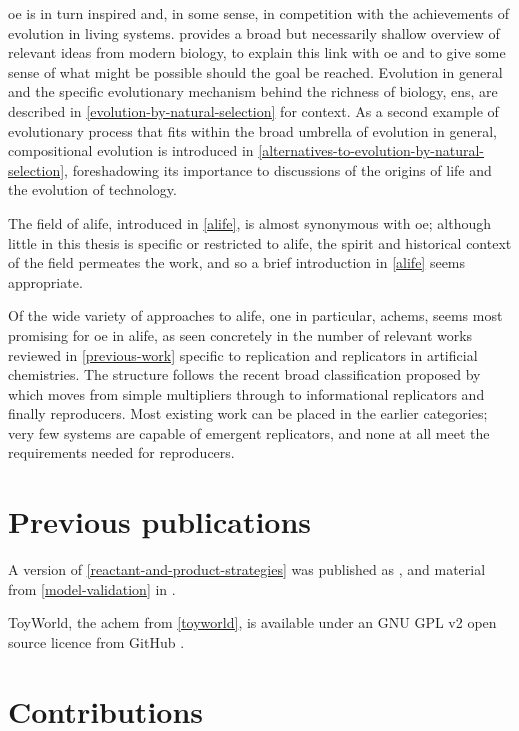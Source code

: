 \Gls{oe} is in turn inspired and, in some sense, in competition with the achievements of evolution in living systems.  provides a broad but necessarily shallow overview of relevant ideas from modern biology, to explain this link with \gls{oe} and to give some sense of what might be possible should the goal be reached. Evolution in general and the specific evolutionary mechanism behind the richness of biology, \gls{ens}, are described in \cref{evolution-by-natural-selection} for context. As a second example of evolutionary process that fits within the broad umbrella of evolution in general, compositional evolution is introduced in \cref{alternatives-to-evolution-by-natural-selection}, foreshadowing its importance to discussions of the origins of life and the evolution of technology.

The field of \gls{alife}, introduced in \cref{alife}, is almost synonymous with \gls{oe}; although little in this thesis is specific or restricted to \gls{alife}, the spirit and historical context of the field permeates the work, and so a brief introduction in \cref{alife} seems appropriate. 

Of the wide variety of approaches to \gls{alife}, one in particular, \glspl{achem}, seems most promising for \gls{oe} in \gls{alife}, as seen concretely in the number of relevant works reviewed in \cref{previous-work} specific to replication and replicators in artificial chemistries. The structure follows the recent broad classification proposed by \textcite{Zachar2010} which moves from simple multipliers through to informational replicators and finally reproducers. Most existing work can be placed in the earlier categories; very few systems are capable of emergent replicators, and none at all meet the requirements needed for reproducers.

\section{Previous publications}\label{previous-publications}

A version of \cref{reactant-and-product-strategies} was published as \textcite{Young2015}, and material from \cref{model-validation} in \textcite{Young2013}.

ToyWorld, the \gls{achem} from \ref{toyworld}, is available under an GNU GPL v2 open source licence from GitHub \textcite{toyworld}.

\section{Contributions}\label{contributions}

